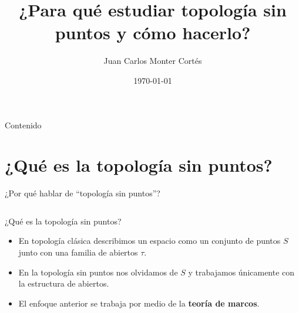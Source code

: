 \documentclass[compress,12pt]{beamer}
\title{¿Para qué estudiar topología sin puntos y cómo hacerlo?}
\date{\today}
\author{Juan Carlos Monter Cortés}
\institute{Universidad de Guadalajara}
\begin{document}
\frame[plain]{\titlepage}

\begin{frame}{Contenido}
\tableofcontents %
\end{frame}

\section{¿Qué es la topología sin puntos?}
\begin{frame}{¿Por qué hablar de ``topología sin puntos''?}
  \centering
  \begin{columns}[c]


  \end{columns}
\end{frame}

\begin{frame}{¿Qué es la topología sin puntos?}
  \begin{itemize}
    \item<1-> En topología clásica describimos un espacio como un conjunto de puntos $S$ junto con una familia de abiertos $\tau$.
    \item<2-> En la topología sin puntos nos olvidamos de $S$ y trabajamos únicamente con la estructura de abiertos.
    \item<3-> El enfoque anterior se trabaja por medio de la \textbf{teoría de marcos}.
  \end{itemize}
  \vspace{1em}
\end{frame}
\end{document}
